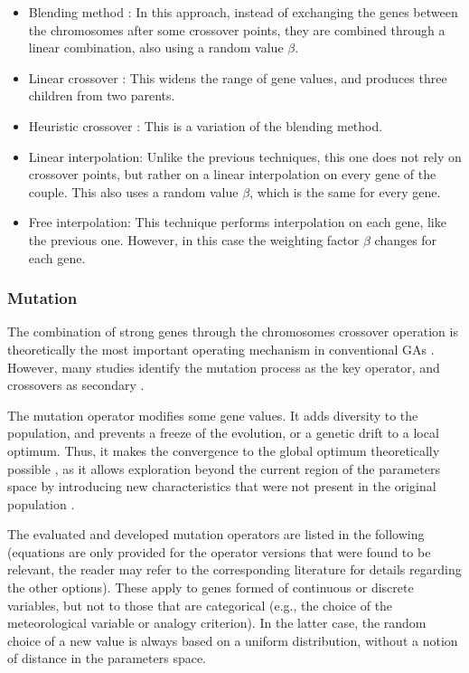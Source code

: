 \documentclass{ametsoc}
\begin{document}
\begin{itemize}
	\item Blending method \citep{Radcliffe1991a}: In this approach, instead of exchanging the genes between the chromosomes after some crossover points, they are combined through a linear combination, also using a random value $\beta$.
	
	\item Linear crossover \citep{Wright1991a}: This widens the range of gene values, and produces three children from two parents.
	
	\item Heuristic crossover \citep{Michalewicz1996}: This is a variation of the blending method.
	
	\item Linear interpolation: Unlike the previous techniques, this one does not rely on crossover points, but rather on a linear interpolation on every gene of the couple. This also uses a random value $\beta$, which is the same for every gene.
	
	\item Free interpolation: This technique performs interpolation on each gene, like the previous one. However, in this case the weighting factor $\beta$ changes for each gene.
	
\end{itemize}


\subsubsection{Mutation}
\label{sec:gas:mutation}

The combination of strong genes through the chromosomes crossover operation is theoretically the most important operating mechanism in conventional GAs \citep{Holland1992b,Back1993b}. However, many studies identify the mutation process as the key operator, and crossovers as secondary \citep[see][]{Back1992a, Back1996a, Back1996b, Smith1997a, Deb1999, Costa2005a, Costa2007a}.

The mutation operator modifies some gene values. It adds diversity to the population, and prevents a freeze of the evolution, or a genetic drift to a local optimum. Thus, it makes the convergence to the global optimum theoretically possible \citep{Beasley1993a}, as it allows exploration beyond the current region of the parameters space by introducing new characteristics that were not present in the original population \citep{Haupt2004}. 

The evaluated and developed mutation operators are listed in the following (equations are only provided for the operator versions that were found to be relevant, the reader may refer to the corresponding literature for details regarding the other options). These apply to genes formed of continuous or discrete variables, but not to those that are categorical (e.g., the choice of the meteorological variable or analogy criterion). In the latter case, the random choice of a new value is always based on a uniform distribution, without a notion of distance in the parameters space.
\end{document}

